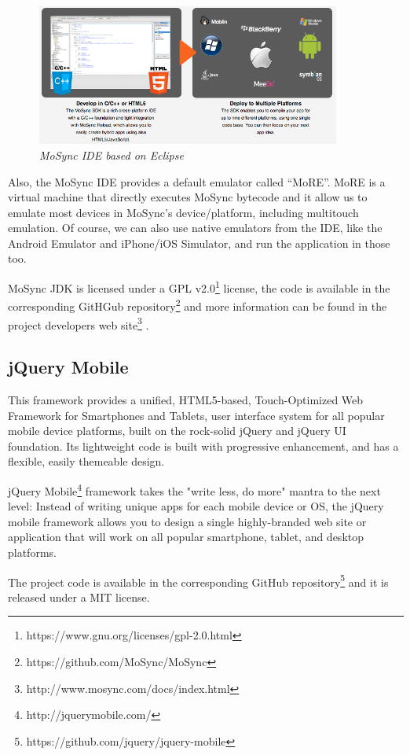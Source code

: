 \documentclass[a4paper,12pt]{book}
\begin{document}
\begin{figure}[H]
    \centering
    \includegraphics[width=10cm, keepaspectratio]{img/mosync.png}
    \caption{\textit{MoSync IDE based on Eclipse}}
 \end{figure}
 
Also, the MoSync IDE provides a default emulator called  “MoRE”. MoRE is a  virtual machine that directly executes MoSync bytecode and  it allow us to emulate most devices in MoSync's device/platform, including  multitouch emulation. Of course, we can also use native emulators from the IDE, like the Android Emulator and iPhone/iOS Simulator, and run the application in those too.

MoSync JDK is licensed under a GPL v2.0\footnote{https://www.gnu.org/licenses/gpl-2.0.html}  license, the code is available in the corresponding GitHGub repository\footnote{https://github.com/MoSync/MoSync}  and more information can be found in the project developers web site\footnote{http://www.mosync.com/docs/index.html} .

\subsection{jQuery Mobile}
\label{jQuery Mobile}

This framework provides a unified, HTML5-based, Touch-Optimized Web Framework for Smartphones and Tablets, user interface system for all popular mobile device platforms, built on the rock-solid jQuery and jQuery UI foundation. Its lightweight code is built with progressive enhancement, and has a flexible, easily themeable design.

jQuery Mobile\footnote{http://jquerymobile.com/}  framework takes the "write less, do more" mantra to the next level: Instead of writing unique apps for each mobile device or OS, the jQuery mobile framework allows you to design a single highly-branded web site or application that will work on all popular smartphone, tablet, and desktop platforms.

The project code is available in the corresponding GitHub repository\footnote{https://github.com/jquery/jquery-mobile} and it is released under a MIT license.
\end{document}
